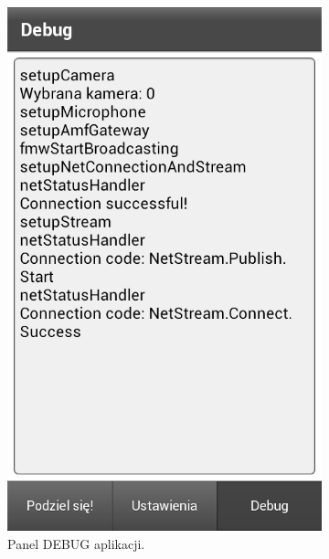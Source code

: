 \begin{figure}[ht]
\begin{subfigure}{0.3\textwidth}
        \includegraphics[width=\textwidth]{img/screens/mobile_broadcaster/panel-debug.png}
        \caption{Panel DEBUG aplikacji.}
        \label{fig:MB4}
    \end{subfigure}
    \quad
    \begin{subfigure}{0.3\textwidth}
        \centering

\end{subfigure}
\end{figure}
